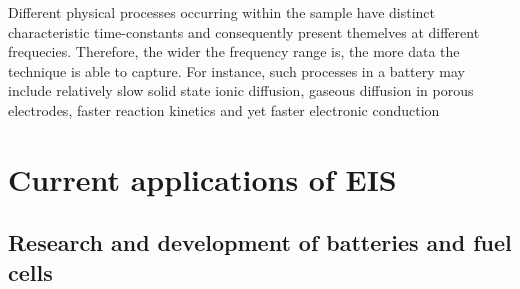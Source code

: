 Different physical processes occurring within the sample have distinct characteristic time-constants and consequently present themelves at different frequecies\cite{ScribnerAssociates}. Therefore, the wider the frequency range is, the more data the technique is able to capture. For instance,  such processes in a battery may include relatively slow solid state ionic diffusion, gaseous diffusion in porous electrodes, faster reaction kinetics and yet faster electronic conduction\cite{ZBStoynov2009}
\newline
	\section{Current applications of EIS}
		\subsection{Research and development of batteries and fuel cells}
